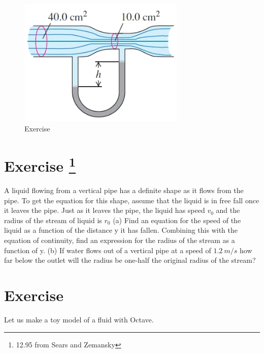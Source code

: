 \documentclass[12pt]{article}
\begin{document}
\begin{figure}[h!]
    \begin{center}
      \includegraphics[height=2.4in]{images/2.jpg}
      \caption{Exercise \theexample }
      \label{2}
    \end{center}
  \end{figure}



  \section*{Exercise \theexample  \footnote{12.95 from Sears and Zemansky} }

  A liquid flowing from a vertical pipe has a definite shape
  as it flows from the pipe. To get the equation for this shape, assume
  that the liquid is in free fall once it leaves the pipe. Just as it leaves
  the pipe, the liquid has speed $v_0$ and the radius of the stream of liquid
  is $r_0$ (a) Find an equation for the speed of the liquid as a function
  of the distance y it has fallen. Combining this with the
  equation of continuity, find an expression for the radius of the
  stream as a function of y. (b) If water flows out of a vertical pipe at
  a speed of $1.2~m/s$ how far below the outlet will the radius be
  one-half the original radius of the stream?



\vspace{20 mm}
\section*{Exercise \theexample  }
Let us make a toy model of a fluid with Octave.
\end{document}
